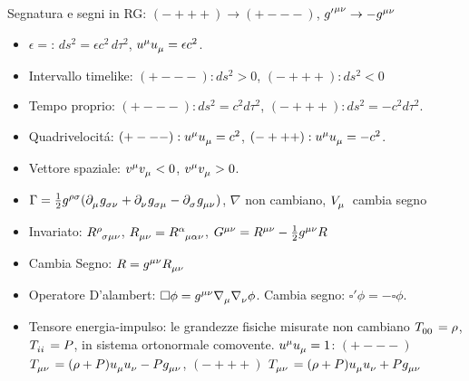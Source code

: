 \begin{frame}{Segnatura e segni in RG: $(-+++)\to(+---)$, $\tensor{g{'}}{^{\mu\nu}}\to-\tensor{g}{^{\mu\nu}}$}
    \begin{itemize}
        \item $\epsilon=$: $ds^2=\epsilon c^2\,d\tau^2$, $\tensor{u}{^\mu}\tensor{u}{_\mu}=\epsilon c^2$.
        \item Intervallo timelike: $(+---): ds^2>0$, $(-+++): ds^2<0$
        \item Tempo proprio: $(+---): ds^2=c^2d\tau^2$, $(-+++): ds^2=-c^2d\tau^2$.
        \item Quadrivelocit\'a: $(+---): \tensor{u}{^\mu}\tensor{u}{_\mu}=c^2$, $(-+++): \tensor{u}{^\mu}\tensor{u}{_\mu}=-c^2$.
        \item Vettore spaziale: $\tensor{v}{^\mu}\tensor{v}{_\mu}<0$, $\tensor{v}{^\mu}\tensor{v}{_\mu}>0$.
        \item $\Gamma=\frac{1}{2}\tensor{g}{^{\rho\sigma}}(\tensor{\partial}{_\mu}\tensor{g}{_{\sigma\nu}}+\tensor{\partial}{_\nu}\tensor{g}{_{\sigma\mu}}-\tensor{\partial}{_\sigma}\tensor{g}{_{\mu\nu}})$, $\nabla$ non cambiano, $\tensor{V}{_\mu}$ cambia segno
        \item Invariato: $\tensor{R}{^\rho_{\sigma\mu\nu}}$, $\tensor{R}{_{\mu\nu}}=\tensor{R}{^\alpha_{\mu\alpha\nu}}$, $\tensor{G}{^{\mu\nu}}=\tensor{R}{^{\mu\nu}}-\frac{1}{2}\tensor{g}{^{\mu\nu}}R$
        \item Cambia Segno: $R=\tensor{g}{^{\mu\nu}}\tensor{R}{_{\mu\nu}}$
        \item Operatore D'alambert: $\square\phi=\tensor{g}{^{\mu\nu}}\tensor{\nabla}{_\mu}\tensor{\nabla}{_\nu}\phi$. Cambia segno: $\square'\phi=-\square\phi$.
        \item Tensore energia-impulso: le grandezze fisiche misurate non cambiano $\tensor{T}{_{00}}=\rho$, $\tensor{T}{_{ii}}=P$, in sistema ortonormale comovente. $\tensor{u}{^\mu}\tensor{u}{_\mu}=1$: $(+---)$ $\tensor{T}{_{\mu\nu}}=(\rho+P)\tensor{u}{_\mu}\tensor{u}{_\nu}-P\tensor{g}{_{\mu\nu}}$, $(-+++)$ $\tensor{T}{_{\mu\nu}}=(\rho+P)\tensor{u}{_\mu}\tensor{u}{_\nu}+P\tensor{g}{_{\mu\nu}}$
    \end{itemize}
\end{frame}


